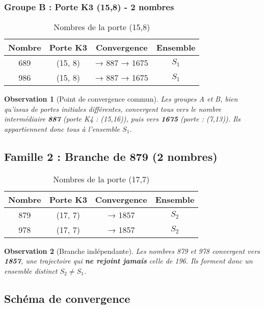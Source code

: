 \documentclass[12pt,a4paper]{article}
\newtheorem{observation}{Observation}[section]
\theoremstyle{remark}
\begin{document}
\subsubsection{Groupe B : Porte K3 (15,8) - 2 nombres}

\begin{table}[h]
\centering
\caption{Nombres de la porte (15,8)}
\begin{tabular}{cccc}
\toprule
\textbf{Nombre} & \textbf{Porte K3} & \textbf{Convergence} & \textbf{Ensemble}\\
\midrule
689 & (15, 8) & → 887 → 1675 & $S_1$\\
986 & (15, 8) & → 887 → 1675 & $S_1$\\
\bottomrule
\end{tabular}
\end{table}

\begin{observation}[Point de convergence commun]
Les groupes A et B, bien qu'issus de portes initiales différentes, convergent tous vers le nombre intermédiaire \textbf{887} (porte K4 : (15,16)), puis vers \textbf{1675} (porte : (7,13)). Ils appartiennent donc tous à l'ensemble $S_1$.
\end{observation}

\subsection{Famille 2 : Branche de 879 (2 nombres)}

\begin{table}[h]
\centering
\caption{Nombres de la porte (17,7)}
\begin{tabular}{cccc}
\toprule
\textbf{Nombre} & \textbf{Porte K3} & \textbf{Convergence} & \textbf{Ensemble}\\
\midrule
879 & (17, 7) & → 1857 & $S_2$\\
978 & (17, 7) & → 1857 & $S_2$\\
\bottomrule
\end{tabular}
\end{table}

\begin{observation}[Branche indépendante]
Les nombres 879 et 978 convergent vers \textbf{1857}, une trajectoire qui \textbf{ne rejoint jamais} celle de 196. Ils forment donc un ensemble distinct $S_2 \neq S_1$.
\end{observation}

\subsection{Schéma de convergence}
\end{document}
